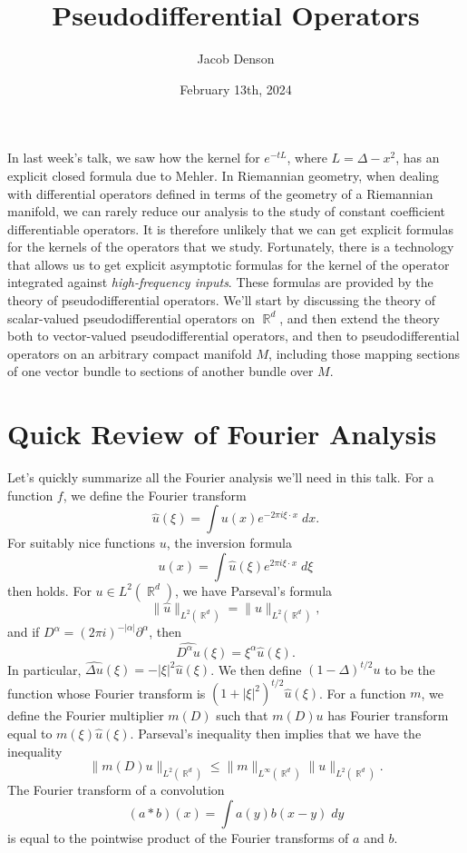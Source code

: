 \documentclass{article}
\title{Pseudodifferential Operators}
\author{Jacob Denson}
\date{February 13th, 2024}
\DeclareMathOperator{\RR}{\mathbb{R}}
\theoremstyle{plain}
\theoremstyle{definition}
\begin{document}
\maketitle

In last week's talk, we saw how the kernel for $e^{-tL}$, where $L = \Delta - x^2$, has an explicit closed formula due to Mehler. In Riemannian geometry, when dealing with differential operators defined in terms of the geometry of a Riemannian manifold, we can rarely reduce our analysis to the study of constant coefficient differentiable operators. It is therefore unlikely that we can get explicit formulas for the kernels of the operators that we study. Fortunately, there is a technology that allows us to get explicit asymptotic formulas for the kernel of the operator integrated against \emph{high-frequency inputs}. These formulas are provided by the theory of pseudodifferential operators. We'll start by discussing the theory of scalar-valued pseudodifferential operators on $\RR^d$, and then extend the theory both to vector-valued pseudodifferential operators, and then to pseudodifferential operators on an arbitrary compact manifold $M$, including those mapping sections of one vector bundle to sections of another bundle over $M$.

\section{Quick Review of Fourier Analysis}

Let's quickly summarize all the Fourier analysis we'll need in this talk. For a function $f$, we define the Fourier transform
%
\[ \widehat{u}(\xi) = \int u(x) e^{-2 \pi i \xi \cdot x}\; dx. \]
%
For suitably nice functions $u$, the inversion formula
%
\[ u(x) = \int \widehat{u}(\xi) e^{2 \pi i \xi \cdot x}\; d\xi \]
%
then holds. For $u \in L^2(\RR^d)$, we have Parseval's formula
%
\[ \| \widehat{u} \|_{L^2(\RR^d)} = \| u \|_{L^2(\RR^d)}, \]
%
and if $D^\alpha = (2 \pi i)^{-|\alpha|} \partial^\alpha$, then
%
\[ \widehat{D^\alpha u}(\xi) = \xi^\alpha \widehat{u}(\xi). \]
%
In particular, $\widehat{\Delta u}(\xi) = - |\xi|^2 \widehat{u}(\xi)$. We then define $(1 - \Delta)^{t/2} u$ to be the function whose Fourier transform is $(1 + |\xi|^2)^{t/2} \widehat{u}(\xi)$. For a function $m$, we define the Fourier multiplier $m(D)$ such that $m(D) u$ has Fourier transform equal to $m(\xi) \widehat{u}(\xi)$. Parseval's inequality then implies that we have the inequality
%
\[ \| m(D) u \|_{L^2(\RR^d)} \leq \| m \|_{L^\infty(\RR^d)} \| u \|_{L^2(\RR^d)}. \]
%
The Fourier transform of a convolution
%
\[ (a * b)(x) = \int a(y) b(x - y)\; dy \]
%
is equal to the pointwise product of the Fourier transforms of $a$ and $b$.
\end{document}
